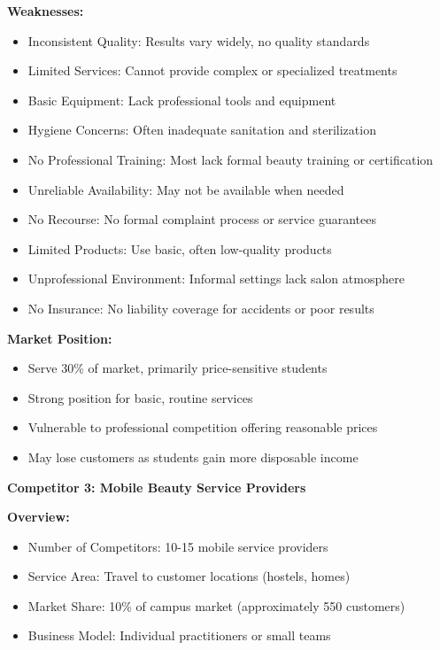 \textbf{Weaknesses:}
\begin{itemize}[leftmargin=2em]
    \item Inconsistent Quality: Results vary widely, no quality standards
    \item Limited Services: Cannot provide complex or specialized treatments
    \item Basic Equipment: Lack professional tools and equipment
    \item Hygiene Concerns: Often inadequate sanitation and sterilization
    \item No Professional Training: Most lack formal beauty training or certification
    \item Unreliable Availability: May not be available when needed
    \item No Recourse: No formal complaint process or service guarantees
    \item Limited Products: Use basic, often low-quality products
    \item Unprofessional Environment: Informal settings lack salon atmosphere
    \item No Insurance: No liability coverage for accidents or poor results
\end{itemize}

\textbf{Market Position:}
\begin{itemize}[leftmargin=2em]
    \item Serve 30\% of market, primarily price-sensitive students
    \item Strong position for basic, routine services
    \item Vulnerable to professional competition offering reasonable prices
    \item May lose customers as students gain more disposable income
\end{itemize}

\vspace{1em}

\textbf{Competitor 3: Mobile Beauty Service Providers}

\textbf{Overview:}
\begin{itemize}[leftmargin=2em]
    \item Number of Competitors: 10-15 mobile service providers
    \item Service Area: Travel to customer locations (hostels, homes)
    \item Market Share: 10\% of campus market (approximately 550 customers)
    \item Business Model: Individual practitioners or small teams
\end{itemize}

